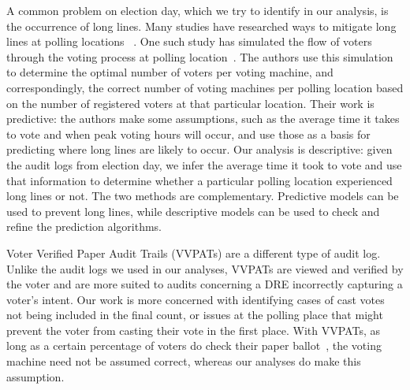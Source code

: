 A common problem on election day, which we try to identify in our analysis, is the occurrence of long lines. Many studies have researched ways to mitigate long lines at polling locations ~\cite{Allen2006,Dow2007,Spencer2010,Wilson2008}.  One such study has simulated the flow of voters through the voting process at polling location~\cite{Edel2010}. The authors use this simulation to determine the optimal number of voters per voting machine, and correspondingly, the correct number of voting machines per polling location based on the number of registered voters at that particular location. Their work is predictive: the authors make some assumptions, such as the average time it takes to vote and when peak voting hours will occur, and use those as a basis for predicting where long lines are likely to occur. Our analysis is descriptive: given the audit logs from election day, we infer the average time it took to vote and use that information to determine whether a particular polling location experienced long lines or not. The two methods are complementary. Predictive models can be used to prevent long lines, while descriptive models can be used to check and refine the prediction algorithms.

Voter Verified Paper Audit Trails (VVPATs) are a different type of audit log. Unlike the audit logs we used in our analyses, VVPATs are viewed and verified by the voter and are more suited to audits concerning a DRE incorrectly capturing a voter\textquoteright s intent. Our work is more concerned with identifying cases of cast votes not being included in the final count, or issues at the polling place that might prevent the voter from casting their vote in the first place. With VVPATs, as long as a certain percentage of voters do check their paper ballot~\cite{Hall2006}, the voting machine need not be assumed correct, whereas our analyses do make this assumption.
